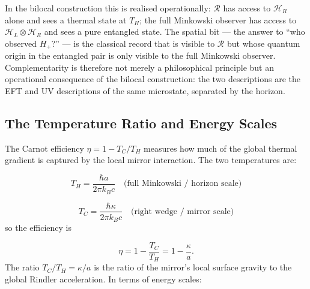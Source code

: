 \documentclass[12pt,a4paper]{article}
\begin{document}
In the bilocal construction this is realised operationally: 
$\mathcal{R}$ has access to $\mathcal{H}_R$ alone and 
sees a thermal state at $T_H$; the full Minkowski observer 
has access to $\mathcal{H}_L \otimes \mathcal{H}_R$ and 
sees a pure entangled state. The spatial bit --- the 
answer to ``who observed $H_+$?'' --- is the classical 
record that is visible to $\mathcal{R}$ but whose 
quantum origin in the entangled pair is only visible 
to the full Minkowski observer. Complementarity is 
therefore not merely a philosophical principle but an 
operational consequence of the bilocal construction: 
the two descriptions are the EFT and UV descriptions 
of the same microstate, separated by the horizon.


\subsection{The Temperature Ratio and Energy Scales}

The Carnot efficiency $\eta = 1 - T_C/T_H$ measures 
how much of the global thermal gradient is captured by 
the local mirror interaction. The two temperatures are:

\begin{equation}
T_H = \frac{\hbar a}{2\pi k_B c} 
\quad \text{(full Minkowski / horizon scale)}
\end{equation}

\begin{equation}
T_C = \frac{\hbar \kappa}{2\pi k_B c}
\quad \text{(right wedge / mirror scale)}
\end{equation}
so the efficiency is

\begin{equation}
\eta = 1 - \frac{T_C}{T_H} = 1 - \frac{\kappa}{a}.
\end{equation}
The ratio $T_C/T_H = \kappa/a$ is the ratio 
of the mirror's local surface gravity to the global 
Rindler acceleration. In terms of energy scales:
\end{document}
